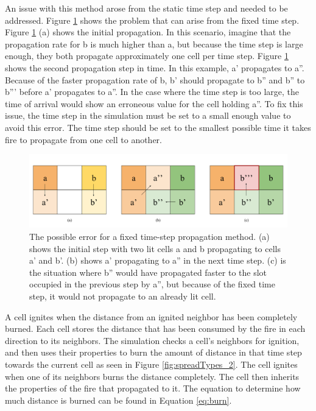 An issue with this method arose from the static time step and needed to be addressed. Figure \ref{fig:accerr} shows the problem that can arise from the fixed time step. Figure \ref{fig:accerr} (a) shows the initial propagation. In this scenario, imagine that the propagation rate for b is much higher than a, but because the time step is large enough, they both propagate approximately one cell per time step. Figure \ref{fig:accerr} shows the second propagation step in time. In this example, a' propagates to a''. Because of the faster propagation rate of b, b' should propagate to b'' and b'' to b''' before a' propagates to a''. In the case where the time step is too large, the time of arrival would show an erroneous value for the cell holding a''. To fix this issue, the time step in the simulation must be set to a small enough value to avoid this error. The time step should be set to the smallest possible time it takes fire to propagate from one cell to another. 

\begin{figure}
\centering
  \includegraphics[width=\linewidth]{figures/implementation/Acceleration_error.png}
  \caption{The possible error for a fixed time-step propagation method. (a) shows the initial step with two lit cells a and b propagating to cells a' and b'. (b) shows a' propagating to a'' in the next time step. (c) is the situation where b'' would have propagated faster to the slot occupied in the previous step by a'', but because of the fixed time step, it would not propagate to an already lit cell.}
  \label{fig:accerr}
\end{figure}

A cell ignites when the distance from an ignited neighbor has been completely burned. Each cell stores the distance that has been consumed by the fire in each direction to its neighbors. The simulation checks a cell's neighbors for ignition, and then uses their properties to burn the amount of distance in that time step towards the current cell as seen in Figure \ref{fig:spreadTypes_2}. The cell ignites when one of its neighbors burns the distance completely. The cell then inherits the properties of the fire that propagated to it. The equation to determine how much distance is burned can be found in Equation \ref{eq:burn}. 


